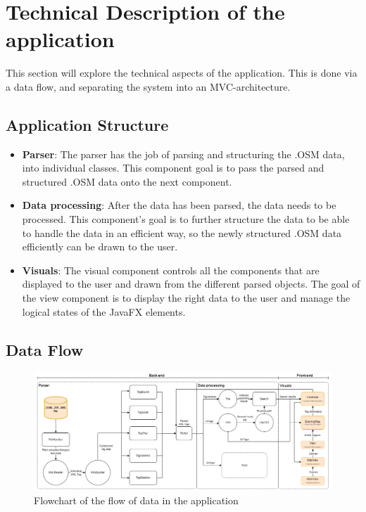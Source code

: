 \section{Technical Description of the application}

This section will explore the technical aspects of the application. This is done via a data flow, and separating the system into an MVC-architecture. 

\subsection{Application Structure}
\begin{itemize}
\setlength{\itemsep}{0.1em}
    \item \textbf{Parser}: The parser has the job of parsing and structuring the .OSM data, into individual classes. This component goal is to pass the parsed and structured .OSM data onto the next component. 
    \item \textbf{Data processing}: After the data has been parsed, the data needs to be processed. This component's goal is to further structure the data to be able to handle the data in an efficient way, so the newly structured .OSM data efficiently can be drawn to the user.
    \item \textbf{Visuals}:  The visual component controls all the components that are displayed to the user and drawn from the different parsed objects. The goal of the view component is to display the right data to the user and manage the logical states of the JavaFX elements.
\end{itemize}

\subsection{Data Flow}
\begin{figure}[ht]%
  \centering
  \includegraphics[width=14.5cm]{docs/material/dataflow.png}%
  \caption{\centering Flowchart of the flow of data in the application}\label{dataflow}%
\end{figure}\\
